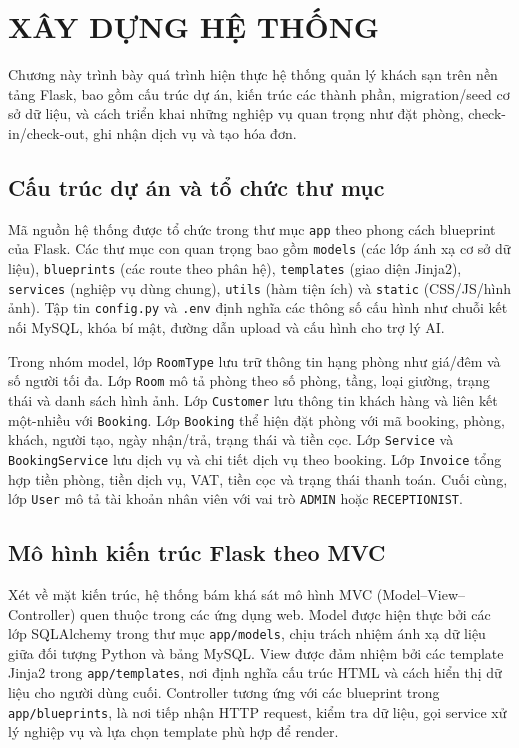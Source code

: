 \documentclass[13pt,a4paper]{extreport}
\begin{document}
\chapter{XÂY DỰNG HỆ THỐNG}

Chương này trình bày quá trình hiện thực hệ thống quản lý khách sạn trên nền tảng Flask, bao gồm cấu trúc dự án, kiến trúc các thành phần, migration/seed cơ sở dữ liệu, và cách triển khai những nghiệp vụ quan trọng như đặt phòng, check-in/check-out, ghi nhận dịch vụ và tạo hóa đơn.

\section{Cấu trúc dự án và tổ chức thư mục}

Mã nguồn hệ thống được tổ chức trong thư mục \texttt{app} theo phong cách blueprint của Flask. Các thư mục con quan trọng bao gồm \texttt{models} (các lớp ánh xạ cơ sở dữ liệu), \texttt{blueprints} (các route theo phân hệ), \texttt{templates} (giao diện Jinja2), \texttt{services} (nghiệp vụ dùng chung), \texttt{utils} (hàm tiện ích) và \texttt{static} (CSS/JS/hình ảnh). Tập tin \texttt{config.py} và \texttt{.env} định nghĩa các thông số cấu hình như chuỗi kết nối MySQL, khóa bí mật, đường dẫn upload và cấu hình cho trợ lý AI.

Trong nhóm model, lớp \texttt{RoomType} lưu trữ thông tin hạng phòng như giá/đêm và số người tối đa. Lớp \texttt{Room} mô tả phòng theo số phòng, tầng, loại giường, trạng thái và danh sách hình ảnh. Lớp \texttt{Customer} lưu thông tin khách hàng và liên kết một-nhiều với \texttt{Booking}. Lớp \texttt{Booking} thể hiện đặt phòng với mã booking, phòng, khách, người tạo, ngày nhận/trả, trạng thái và tiền cọc. Lớp \texttt{Service} và \texttt{BookingService} lưu dịch vụ và chi tiết dịch vụ theo booking. Lớp \texttt{Invoice} tổng hợp tiền phòng, tiền dịch vụ, VAT, tiền cọc và trạng thái thanh toán. Cuối cùng, lớp \texttt{User} mô tả tài khoản nhân viên với vai trò \texttt{ADMIN} hoặc \texttt{RECEPTIONIST}.

\section{Mô hình kiến trúc Flask theo MVC}

Xét về mặt kiến trúc, hệ thống bám khá sát mô hình MVC (Model--View--Controller) quen thuộc trong các ứng dụng web. Model được hiện thực bởi các lớp SQLAlchemy trong thư mục \texttt{app/models}, chịu trách nhiệm ánh xạ dữ liệu giữa đối tượng Python và bảng MySQL. View được đảm nhiệm bởi các template Jinja2 trong \texttt{app/templates}, nơi định nghĩa cấu trúc HTML và cách hiển thị dữ liệu cho người dùng cuối. Controller tương ứng với các blueprint trong \texttt{app/blueprints}, là nơi tiếp nhận HTTP request, kiểm tra dữ liệu, gọi service xử lý nghiệp vụ và lựa chọn template phù hợp để render.
\end{document}
